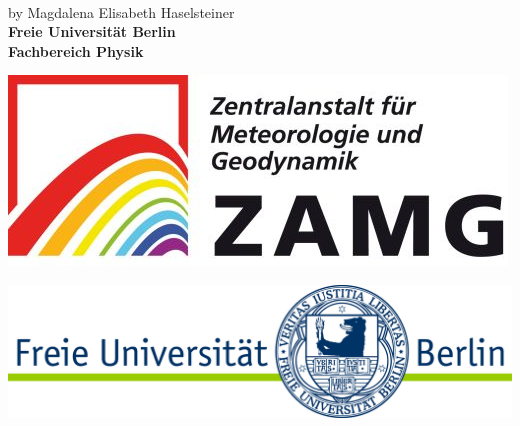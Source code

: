 \documentclass[12pt]{report}
\author{Magdalena Haselsteiner}
\date{February 2017}
\begin{document}
\setlength\parindent{0pt}
\begin{titlepage}

\\
        \vspace{1.5 cm}
        {\Large by Magdalena Elisabeth Haselsteiner}\\
        \vspace{4.5cm}
        \centering \textbf{ {\large Freie Universität Berlin\\ Fachbereich Physik}}
        
		\vspace{3cm}
        \begin{adjustbox}{left=30cm}
   

	    \end{adjustbox}
	    \vspace{\fill}
	
        \hspace{-3cm}
	   \begin{minipage}[B]{0.3\textwidth }
	   
	        \includegraphics[width=\textwidth] {graphics/logos/ZAMGhead.jpg}
	     
	       \end{minipage}
     \hspace{2.5cm}
   \begin{minipage}[B]{0.5\textwidth }

	        \includegraphics[width=\textwidth ] {graphics/logos/FULogo.jpg}
	       

\end{minipage}
\end{titlepage}
\end{document}
